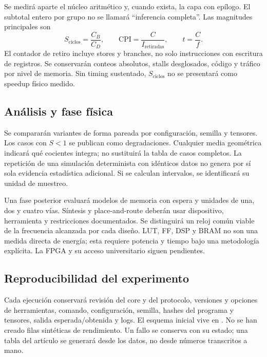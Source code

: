 Se medirá aparte el núcleo aritmético y, cuando exista, la capa con epílogo.
El subtotal entero por grupo no se llamará ``inferencia completa''. Las
magnitudes principales son
\begin{equation}
S_{\mathrm{ciclos}}=\frac{C_B}{C_D},\qquad
\mathrm{CPI}=\frac{C}{I_{\mathrm{retiradas}}},\qquad
t=\frac{C}{f}.
\end{equation}
El contador de retiro incluye stores y branches, no solo instrucciones con
escritura de registros. Se conservarán conteos absolutos, stalls desglosados,
código y tráfico por nivel de memoria. Sin timing sustentado, \(S_{\mathrm{ciclos}}\)
no se presentará como speedup físico medido.

\subsection{Análisis y fase física}
Se compararán variantes de forma pareada por configuración, semilla y tensores.
Los casos con \(S<1\) se publican como degradaciones. Cualquier media geométrica
indicará qué cocientes integra; no sustituirá la tabla de casos completos.
La repetición de una simulación determinista con idénticos datos no genera
por sí sola evidencia estadística adicional. Si se calculan intervalos,
se identificará su unidad de muestreo.

Una fase posterior evaluará modelos de memoria con espera y unidades de una,
dos y cuatro vías. Síntesis y place-and-route deberán usar dispositivo,
herramienta y restricciones documentados. Se distinguirá un reloj común
viable de la frecuencia alcanzada por cada diseño. LUT, FF, DSP y BRAM no
son una medida directa de energía; esta requiere potencia y tiempo bajo una
metodología explícita. La FPGA y su acceso universitario siguen pendientes.

\subsection{Reproducibilidad del experimento}
Cada ejecución conservará revisión del core y del protocolo, versiones y
opciones de herramientas, comando, configuración, semilla, hashes del programa
y tensores, salida esperada/obtenida y logs. El esquema inicial vive en
. No se han creado filas sintéticas de rendimiento.
Un fallo se conserva con su estado; una tabla del artículo se generará desde
los datos, no desde números transcritos a mano.
